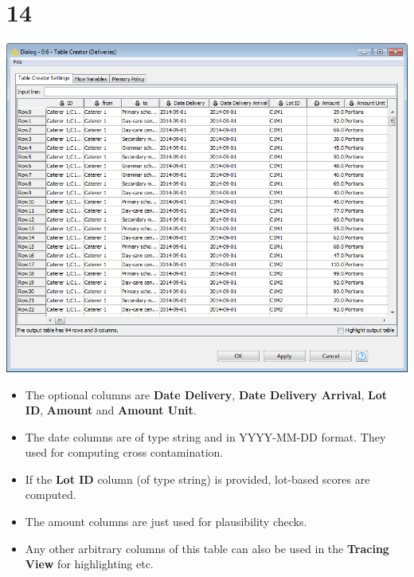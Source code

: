 \documentclass[10pt]{beamer}
\begin{document}
\section{14}
\begin{frame}
	\begin{center}
  		\includegraphics[height=0.45\textheight]{14.png}
	\end{center}
	\begin{itemize}
		\item The optional columns are \textbf{Date Delivery}, \textbf{Date Delivery Arrival}, \textbf{Lot ID}, \textbf{Amount} and \textbf{Amount Unit}.
		\item The date columns are of type string and in YYYY-MM-DD format. They used for computing cross contamination.
		\item If the \textbf{Lot ID} column (of type string) is provided, lot-based scores are computed.
		\item The amount columns are just used for plausibility checks.
		\item Any other arbitrary columns of this table can also be used in the \textbf{Tracing View} for highlighting etc.
	\end{itemize}
\end{frame}
\end{document}
